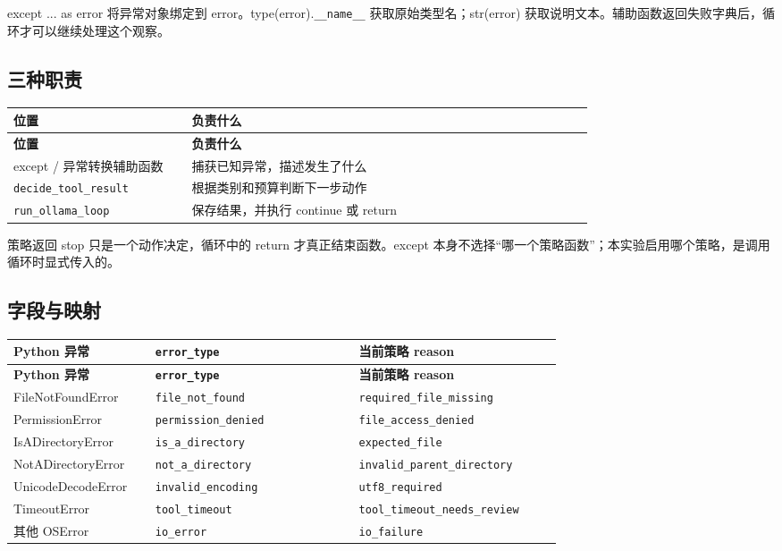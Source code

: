 \documentclass[UTF8,zihao=-4,fontset=fandol]{ctexart}
\begin{document}
except ... as error 将异常对象绑定到 error。type(error).\nolinkurl{__name__} 获取原始类型名；str(error) 获取说明文本。辅助函数返回失败字典后，循环才可以继续处理这个观察。

\subsection{三种职责}

{\small\setlength{\tabcolsep}{4pt}
\renewcommand{\arraystretch}{1.25}
\begin{longtable}{>{\raggedright\arraybackslash}p{0.28\linewidth}>{\raggedright\arraybackslash}p{0.63\linewidth}}
\toprule
\textbf{位置} & \textbf{负责什么} \\
\midrule\endfirsthead
\toprule
\textbf{位置} & \textbf{负责什么} \\
\midrule\endhead
\bottomrule\endfoot
except / 异常转换辅助函数 & 捕获已知异常，描述发生了什么 \\
\nolinkurl{decide_tool_result} & 根据类别和预算判断下一步动作 \\
\nolinkurl{run_ollama_loop} & 保存结果，并执行 continue 或 return \\
\end{longtable}}

策略返回 stop 只是一个动作决定，循环中的 return 才真正结束函数。except 本身不选择“哪一个策略函数”；本实验启用哪个策略，是调用循环时显式传入的。

\subsection{字段与映射}

{\small\setlength{\tabcolsep}{4pt}
\renewcommand{\arraystretch}{1.25}
\begin{longtable}{>{\raggedright\arraybackslash}p{0.23\linewidth}>{\raggedright\arraybackslash}p{0.33\linewidth}>{\raggedright\arraybackslash}p{0.33\linewidth}}
\toprule
\textbf{Python 异常} & \textbf{\nolinkurl{error_type}} & \textbf{当前策略 reason} \\
\midrule\endfirsthead
\toprule
\textbf{Python 异常} & \textbf{\nolinkurl{error_type}} & \textbf{当前策略 reason} \\
\midrule\endhead
\bottomrule\endfoot
FileNotFoundError & \nolinkurl{file_not_found} & \nolinkurl{required_file_missing} \\
PermissionError & \nolinkurl{permission_denied} & \nolinkurl{file_access_denied} \\
IsADirectoryError & \nolinkurl{is_a_directory} & \nolinkurl{expected_file} \\
NotADirectoryError & \nolinkurl{not_a_directory} & \nolinkurl{invalid_parent_directory} \\
UnicodeDecodeError & \nolinkurl{invalid_encoding} & \nolinkurl{utf8_required} \\
TimeoutError & \nolinkurl{tool_timeout} & \nolinkurl{tool_timeout_needs_review} \\
其他 OSError & \nolinkurl{io_error} & \nolinkurl{io_failure} \\
\end{longtable}}
\end{document}
